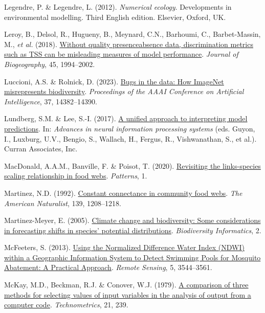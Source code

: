 \documentclass[
  letterpaper,
]{scrbook}
\newlength{\cslhangindent}
\newenvironment{CSLReferences}[2] %
 {\begin{list}{}{%
  \setlength{\itemindent}{0pt}
  \setlength{\leftmargin}{0pt}
  \setlength{\parsep}{0pt}
  \ifodd #1
   \setlength{\leftmargin}{\cslhangindent}
   \setlength{\itemindent}{-1\cslhangindent}
  \fi
  \setlength{\itemsep}{#2\baselineskip}}}
 {\end{list}}
\begin{document}
\begin{CSLReferences}{1}{0}
Legendre, P. \& Legendre, L. (2012). \emph{Numerical ecology}.
Developments in environmental modelling. Third English edition.
Elsevier, Oxford, UK.

Leroy, B., Delsol, R., Hugueny, B., Meynard, C.N., Barhoumi, C.,
Barbet-Massin, M., \emph{et al.} (2018).
\href{https://doi.org/10.1111/jbi.13402}{Without quality
presence{\textendash}absence data, discrimination metrics such as TSS
can be misleading measures of model performance}. \emph{Journal of
Biogeography}, 45, 1994--2002.

Luccioni, A.S. \& Rolnick, D. (2023).
\href{https://doi.org/10.1609/aaai.v37i12.26682}{Bugs in the data: How
ImageNet misrepresents biodiversity}. \emph{Proceedings of the AAAI
Conference on Artificial Intelligence}, 37, 14382--14390.

Lundberg, S.M. \& Lee, S.-I. (2017).
\href{https://proceedings.neurips.cc/paper_files/paper/2017/file/8a20a8621978632d76c43dfd28b67767-Paper.pdf}{A
unified approach to interpreting model predictions}. In: \emph{Advances
in neural information processing systems} (eds. Guyon, I., Luxburg,
U.V., Bengio, S., Wallach, H., Fergus, R., Vishwanathan, S., et al.).
Curran Associates, Inc.

MacDonald, A.A.M., Banville, F. \& Poisot, T. (2020).
\href{https://doi.org/10.1016/j.patter.2020.100079}{Revisiting the
links-species scaling relationship in food webs}. \emph{Patterns}, 1.

Martinez, N.D. (1992).
\href{http://www.jstor.org/stable/2462337}{Constant connectance in
community food webs}. \emph{The American Naturalist}, 139, 1208--1218.

Martinez-Meyer, E. (2005).
\href{https://doi.org/10.17161/bi.v2i0.8}{Climate change and
biodiversity: Some considerations in forecasting shifts in species'
potential distributions}. \emph{Biodiversity Informatics}, 2.

McFeeters, S. (2013). \href{https://doi.org/10.3390/rs5073544}{Using the
Normalized Difference Water Index (NDWI) within a Geographic Information
System to Detect Swimming Pools for Mosquito Abatement: A Practical
Approach}. \emph{Remote Sensing}, 5, 3544--3561.

McKay, M.D., Beckman, R.J. \& Conover, W.J. (1979).
\href{https://doi.org/10.2307/1268522}{A comparison of three methods for
selecting values of input variables in the analysis of output from a
computer code}. \emph{Technometrics}, 21, 239.


\end{CSLReferences}
\end{document}
